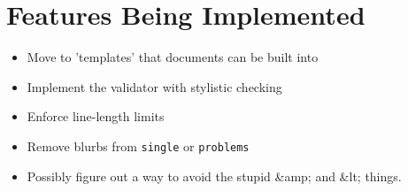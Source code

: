 \section{Features Being Implemented}
  \begin{itemize}
    \item Move to 'templates' that documents can be built into 
    \item Implement the validator with stylistic checking
    \item Enforce line-length limits
    \item Remove blurbs from \texttt{single} or \texttt{problems}
    \item Possibly figure out a way to avoid the stupid \&amp; and \&lt; things.
  \end{itemize}